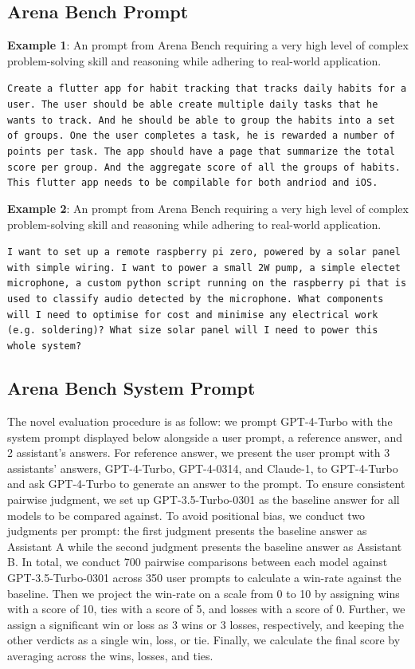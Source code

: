 \documentclass{article}
\begin{document}
\newpage
\color{black}\subsection{Arena Bench Prompt}
\label{subsec:arena-bench-examples}


\textbf{Example 1}: An prompt from Arena Bench requiring a very high level of complex problem-solving skill and reasoning while adhering to real-world application.
\begin{tcolorbox}
    \texttt{Create a flutter app for habit tracking that tracks daily habits for a user. The user should be able create multiple daily tasks that he wants to track. And he should be able to group the habits into a set of groups. One the user completes a task, he is rewarded a number of points per task. The app should have a page that summarize the total score per group. And the aggregate score of all the groups of habits. This flutter app needs to be compilable for both andriod and iOS.}
\end{tcolorbox}

\textbf{Example 2}: An prompt from Arena Bench requiring a very high level of complex problem-solving skill and reasoning while adhering to real-world application.
\begin{tcolorbox}
    \texttt{I want to set up a remote raspberry pi zero, powered by a solar panel with simple wiring. I want to power a small 2W pump, a simple electet microphone, a custom python script running on the raspberry pi that is used to classify audio detected by the microphone. What components will I need to optimise for cost and minimise any electrical work (e.g. soldering)? What size solar panel will I need to power this whole system?}
\end{tcolorbox}

\newpage
\color{black}\subsection{Arena Bench System Prompt}
\label{subsec:arena-bench-sys-prompt}
The novel evaluation procedure is as follow: we prompt GPT-4-Turbo with the system prompt displayed below alongside a user prompt, a reference answer, and 2 assistant's answers. For reference answer, we present the user prompt with 3 assistants' answers, GPT-4-Turbo, GPT-4-0314, and Claude-1, to GPT-4-Turbo and ask GPT-4-Turbo to generate an answer to the prompt. To ensure consistent pairwise judgment, we set up GPT-3.5-Turbo-0301 as the baseline answer for all models to be compared against. To avoid positional bias, we conduct two judgments per prompt: the first judgment presents the baseline answer as Assistant A while the second judgment presents the baseline answer as Assistant B. In total, we conduct 700 pairwise comparisons between each model against GPT-3.5-Turbo-0301 across 350 user prompts to calculate a win-rate against the baseline. Then we project the win-rate on a scale from 0 to 10 by assigning wins with a score of 10, ties with a score of 5, and losses with a score of 0. Further, we assign a significant win or loss as 3 wins or 3 losses, respectively, and keeping the other verdicts as a single win, loss, or tie. Finally, we calculate the final score by averaging across the wins, losses, and ties.
\end{document}
